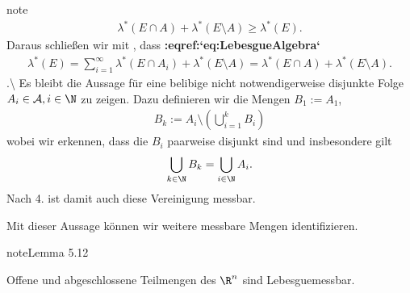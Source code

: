 \documentclass[letterpaper,10pt,german]{jupyterBook}
\begin{document}
\begin{sphinxadmonition}{note}
\begin{equation*}
\begin{split}
\lambda^\ast(E\cap A) + \lambda^\ast(E\setminus A) \geq \lambda^\ast(E).\end{split}
\end{equation*}
\sphinxAtStartPar
Daraus schließen wir mit , dass {\color{red}\bfseries{}:eqref:`eq:LebesgueAlgebra`}
\begin{equation*}
\begin{split}\lambda^\ast(E) = \sum_{i=1}^\infty \lambda^\ast(E\cap A_i) + \lambda^\ast(E\setminus A) =
\lambda^\ast(E\cap A) + \lambda^\ast(E\setminus A).\end{split}
\end{equation*}
.\textbackslash{} Es bleibt die Aussage für eine belibige nicht notwendigerweise disjunkte Folge \(A_i\in\mathcal{A}, i\in\N\) zu zeigen. Dazu definieren wir die Mengen \(B_1:=A_1\),
\begin{equation*}
\begin{split}B_k := A_i\setminus \left(\bigcup_{i=1}^k B_i  \right)\end{split}
\end{equation*}
\sphinxAtStartPar
wobei wir erkennen, dass die \(B_i\) paarweise disjunkt sind und insbesondere gilt
\begin{equation*}
\begin{split}\bigcup_{k\in\N} B_k = \bigcup_{i\in\N} A_i.\end{split}
\end{equation*}
\sphinxAtStartPar
Nach 4. ist damit auch diese Vereinigung messbar.
\end{sphinxadmonition}

\sphinxAtStartPar
Mit dieser Aussage können wir weitere messbare Mengen identifizieren.
\label{masstheorie/masstheorie:thm:lebesgueOffenAbgeschlossen}
\begin{sphinxadmonition}{note}{Lemma 5.12}



\sphinxAtStartPar
Offene und abgeschlossene Teilmengen des \(\R^n\) sind Lebesgue\sphinxhyphen{}messbar.
\end{sphinxadmonition}
\end{document}
